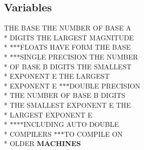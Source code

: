 \subsection*{Variables}
\begin{DoxyCompactItemize}
\item 
\hypertarget{namespaceport_a3456456e955c9b66451c1a5009bf326c}{T\+H\+E B\+A\+S\+E T\+H\+E N\+U\+M\+B\+E\+R O\+F B\+A\+S\+E A \\*
D\+I\+G\+I\+T\+S T\+H\+E L\+A\+R\+G\+E\+S\+T M\+A\+G\+N\+I\+T\+U\+D\+E \\*
$\ast$$\ast$$\ast$F\+L\+O\+A\+T\+S H\+A\+V\+E F\+O\+R\+M T\+H\+E B\+A\+S\+E \\*
$\ast$$\ast$$\ast$S\+I\+N\+G\+L\+E P\+R\+E\+C\+I\+S\+I\+O\+N T\+H\+E N\+U\+M\+B\+E\+R \\*
O\+F B\+A\+S\+E B D\+I\+G\+I\+T\+S T\+H\+E S\+M\+A\+L\+L\+E\+S\+T \\*
E\+X\+P\+O\+N\+E\+N\+T E T\+H\+E L\+A\+R\+G\+E\+S\+T \\*
E\+X\+P\+O\+N\+E\+N\+T E $\ast$$\ast$$\ast$D\+O\+U\+B\+L\+E P\+R\+E\+C\+I\+S\+I\+O\+N \\*
T\+H\+E N\+U\+M\+B\+E\+R O\+F B\+A\+S\+E B D\+I\+G\+I\+T\+S \\*
T\+H\+E S\+M\+A\+L\+L\+E\+S\+T E\+X\+P\+O\+N\+E\+N\+T E T\+H\+E \\*
L\+A\+R\+G\+E\+S\+T E\+X\+P\+O\+N\+E\+N\+T E \\*
$\ast$$\ast$$\ast$$\ast$I\+N\+C\+L\+U\+D\+I\+N\+G A\+U\+T\+O D\+O\+U\+B\+L\+E \\*
C\+O\+M\+P\+I\+L\+E\+R\+S $\ast$$\ast$$\ast$T\+O C\+O\+M\+P\+I\+L\+E O\+N \\*
O\+L\+D\+E\+R {\bfseries M\+A\+C\+H\+I\+N\+E\+S}}\label{namespaceport_a3456456e955c9b66451c1a5009bf326c}


\end{DoxyCompactItemize}
